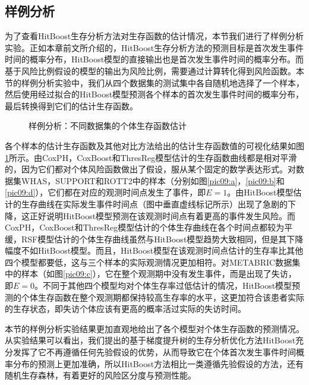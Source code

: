 \subsection{样例分析}

为了查看HitBoost生存分析方法对生存函数的估计情况，本节我们进行了样例分析实验。正如本章前文所介绍的，HitBoost生存分析方法的预测目标是首次发生事件时间的概率分布，HitBoost模型的直接输出也是首次发生事件时间的概率分布。而基于风险比例假设的模型的输出为风险比例，需要通过计算转化得到风险函数。本节的样例分析实验中，我们从四个数据集的测试集中各自随机地选择了一个样本，然后使用经过拟合的HitBoost模型预测各个样本的首次发生事件时间的概率分布，最后转换得到它们的估计生存函数。
\begin{figure}[h]
\centering 
{}
\hspace{0.01\linewidth}
\vfill
{}
\hspace{0.01\linewidth}
\caption{样例分析：不同数据集的个体生存函数估计}
\label{pic09}
\end{figure}

各个样本的估计生存函数及其他对比方法给出的估计生存函数值的可视化结果如图\ref{pic09}所示。由CoxPH，CoxBoost和ThresReg模型估计的生存函数曲线都是相对平滑的，因为它们都对个体风险函数做出了假设，服从某个固定的数学表达形式。对数据集WHAS，SUPPORT和ROTT2中的样本（分别如图\ref{pic09:a}，\ref{pic09:b}和\ref{pic09:d}），它们都在对应的观测时间点发生了事件，即$E=1$。由HitBoost模型估计的生存曲线在实际发生事件时间点（图中垂直虚线标记所示）出现了急剧的下降，这正好说明HitBoost模型预测在该观测时间点有着更高的事件发生风险。而CoxPH，CoxBoost和ThresReg模型估计的个体生存曲线在各个时间点都较为平缓，RSF模型估计的个体生存曲线虽然与HitBoost模型趋势大致相同，但是其下降幅度不如HitBoost模型。而且，HitBoost模型在该观测时间点估计的生存率比其他四个模型都要低，这与三个样本的实际观测情况更加相符。对METABRIC数据集中的样本（如图\ref{pic09:c}），它在整个观测期中没有发生事件，而是出现了失访，即$E=0$。不同于其他四个模型均对个体生存率过低估计的情况，HitBoost模型预测的个体生存函数在整个观测期都保持较高生存率的水平，这更加符合该患者实际的生存状态，即失访个体应该有更高的概率活过实际的失访时间。 

本节的样例分析实验结果更加直观地给出了各个模型对个体生存函数的预测情况。从实验结果可以看出，我们提出的基于梯度提升树的生存分析优化方法HitBoost充分发挥了它不再遵循任何先验假设的优势，从而导致它在个体首次发生事件时间概率分布的预测上更加准确，所以HitBoost方法相比一类遵循先验假设的方法，还有随机生存森林，有着更好的风险区分度与预测性能。

